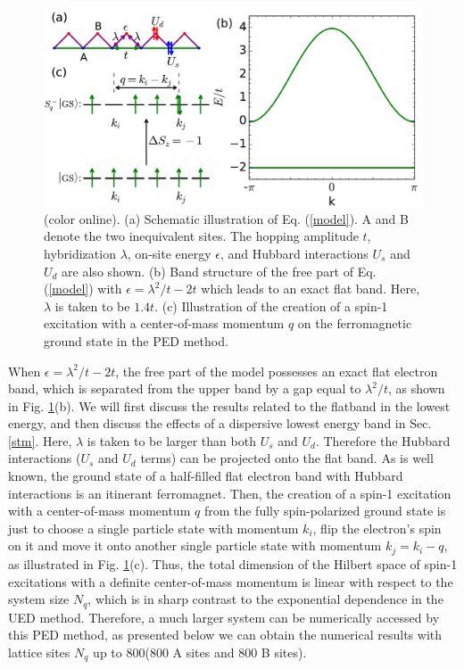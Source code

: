 \documentclass[amsmath,superscriptaddress,showpacs,aps,prb,twocolumn]{revtex4-1}
\begin{document}
\begin{figure}
\includegraphics[scale=0.4]{lattice}
\caption{(color online). (a) Schematic illustration of Eq. (\ref{model}). A and B denote the two inequivalent sites. The hopping amplitude $t$, hybridization $\lambda$, on-site energy $\epsilon$, and Hubbard interactions $U_s$ and $U_d$ are also shown. (b) Band structure of the free part of Eq. (\ref{model}) with $\epsilon=\lambda^2/t-2t$ which leads to an exact flat band. Here, $\lambda$ is taken to be $1.4t$. (c) Illustration of the creation of a spin-1 excitation with a center-of-mass momentum $q$ on the ferromagnetic ground state in the PED method.}
\label{lattice}
\end{figure}

\par When $\epsilon=\lambda^2/t-2t$, the free part of the model possesses an exact flat electron band, which is separated from the upper band by a gap equal to $\lambda^2/t$, as shown in Fig. \ref{lattice}(b). We will first discuss the results related to the flatband in the lowest energy, and then discuss the effects of a dispersive lowest energy band in Sec. \ref{stm}. Here, $\lambda$ is taken to be larger than both $U_s$ and $U_d$. Therefore the Hubbard interactions ($U_s$ and $U_d$ terms) can be projected onto the flat band. As is well known, the ground state of a half-filled flat electron band with Hubbard interactions is an itinerant ferromagnet. Then, the creation of a spin-1 excitation with a center-of-mass momentum $q$ from the fully spin-polarized ground state is just to choose a single particle state with momentum $k_i$, flip the electron's spin on it and move it onto another single particle state with momentum $k_j=k_i-q$, as illustrated in Fig. \ref{lattice}(c). Thus, the total dimension of the Hilbert space of spin-1 excitations with a definite center-of-mass momentum is linear with respect to the system size $N_q$, which is in sharp contrast to the exponential dependence in the UED method. Therefore, a much larger system can be numerically accessed by this PED method, as presented below we can obtain the numerical results with lattice sites $N_q$ up to $800$(800 A sites and 800 B sites).
\end{document}
